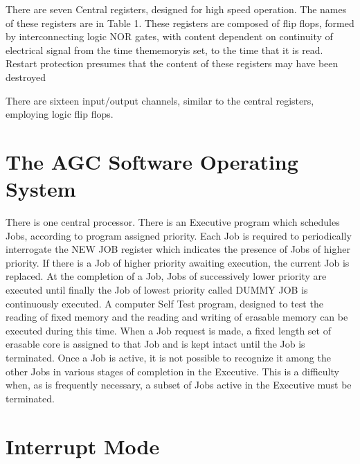 \documentclass[oxford]{ahsan}
\begin{document}
There are seven Central registers, designed for high speed operation. The names of
these registers are in Table 1. These registers are composed of flip flops, formed by
interconnecting logic NOR gates, with content dependent on continuity of electrical
signal from the time thememoryis set, to the time that it is read. Restart protection
presumes that the content of these registers may have been destroyed

There are sixteen input/output channels, similar to the central registers, employing
logic flip flops.

\section{The AGC Software Operating System}

There is one central processor. There is an Executive program which schedules Jobs,
according to program assigned priority. Each Job is required to periodically
interrogate the NEW JOB register which indicates the presence of Jobs of higher
priority. If there is a Job of higher priority awaiting execution, the current Job is
replaced. At the completion of a Job, Jobs of successively lower priority are executed
until finally the Job of lowest priority called DUMMY JOB is continuously executed. A
computer Self Test program, designed to test the reading of fixed memory and the
reading and writing of erasable memory can be executed during this time. When a Job
request is made, a fixed length set of erasable core is assigned to that Job and is
kept intact until the Job is terminated. Once a Job is active, it is not possible to
recognize it among the other Jobs in various stages of completion in the Executive.
This is a difficulty when, as is frequently necessary, a subset of Jobs active in the
Executive must be terminated.


\section{Interrupt Mode}
\end{document}
